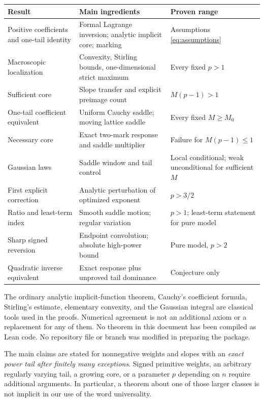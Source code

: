 \documentclass[11pt,a4paper]{article}
\numberwithin{equation}{section}
\theoremstyle{definition}
\theoremstyle{remark}
\begin{document}
\begin{center}\small
\begin{tabular}{>{\raggedright\arraybackslash}p{}>{\raggedright\arraybackslash}p{}>{\raggedright\arraybackslash}p{}}
\toprule
Result & Main ingredients & Proven range\\
\midrule
Positive coefficients and one-tail identity & Formal Lagrange inversion;
analytic implicit core; marking & Assumptions \eqref{eq:assumptions}\\[4pt]
Macroscopic localization & Convexity, Stirling bounds, one-dimensional
strict maximum & Every fixed $p>1$\\[4pt]
Sufficient core & Slope transfer and explicit preimage count &
$M(p-1)>1$\\[4pt]
One-tail coefficient equivalent & Uniform Cauchy saddle; moving lattice
saddle & Every fixed $M\ge M_0$\\[4pt]
Necessary core & Exact two-mark response and saddle multiplier &
Failure for $M(p-1)\le1$\\[4pt]
Gaussian laws & Saddle window and tail control & Local conditional;
weak unconditional for sufficient $M$\\[4pt]
First explicit correction & Analytic perturbation of optimized exponent &
$p>3/2$\\[4pt]
Ratio and least-term index & Smooth saddle motion; regular variation &
$p>1$; least-term statement for pure model\\[4pt]
Sharp signed reversion & Endpoint convolution; absolute high-power bound &
Pure model, $p>2$\\[4pt]
Quadratic inverse equivalent & Exact response plus unproved tail dominance &
Conjecture only\\
\bottomrule
\end{tabular}
\end{center}

The ordinary analytic implicit-function theorem, Cauchy's coefficient formula,
Stirling's estimate, elementary convexity, and the Gaussian integral are
classical tools used in the proofs. Numerical agreement is not an additional
axiom or a replacement for any of them. No theorem in this document has
been compiled as Lean code. No repository file or branch was modified in
preparing the package.

The main claims are stated for nonnegative weights and slopes with an
\emph{exact power tail after finitely many exceptions}. Signed primitive
weights, an arbitrary regularly varying tail, a growing core, or a
parameter $p$ depending on $n$ require additional arguments. In particular,
a theorem about one of those larger classes is not implicit in our use of
the word universality.
\end{document}
